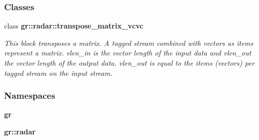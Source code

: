 \subsubsection*{Classes}
\begin{DoxyCompactItemize}
\item 
class {\bf gr\+::radar\+::transpose\+\_\+matrix\+\_\+vcvc}
\begin{DoxyCompactList}\small\item\em This block transposes a matrix. A tagged stream combined with vectors as items represent a matrix. vlen\+\_\+in is the vector length of the input data and vlen\+\_\+out the vector length of the output data. vlen\+\_\+out is equal to the items (vectors) per tagged stream on the input stream. \end{DoxyCompactList}\end{DoxyCompactItemize}
\subsubsection*{Namespaces}
\begin{DoxyCompactItemize}
\item 
 {\bf gr}
\item 
 {\bf gr\+::radar}
\end{DoxyCompactItemize}
